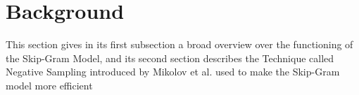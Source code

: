
\section{Background}\label{sec:background}

This section gives in its first subsection a broad overview over the functioning of the Skip-Gram Model, and its second section describes the Technique called Negative Sampling introduced by Mikolov et al. \citep{mikolov2} used to make the Skip-Gram model more efficient
